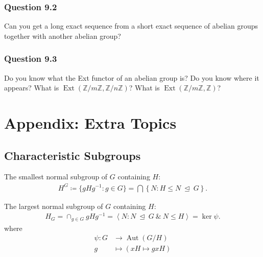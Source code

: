\hypertarget{question-9.2}{%
\subsubsection{Question 9.2}\label{question-9.2}}

Can you get a long exact sequence from a short exact sequence of abelian
groups together with another abelian group?

\hypertarget{question-9.3}{%
\subsubsection{Question 9.3}\label{question-9.3}}

Do you know what the Ext functor of an abelian group is? Do you know
where it appears? What is
\(\operatorname{Ext}({\mathbb{Z}}/m{\mathbb{Z}}, {\mathbb{Z}}/n{\mathbb{Z}})\)?
What is
\(\operatorname{Ext}({\mathbb{Z}}/m{\mathbb{Z}}, {\mathbb{Z}})\)?

\hypertarget{appendix-extra-topics}{%
\section{Appendix: Extra Topics}\label{appendix-extra-topics}}

\hypertarget{characteristic-subgroups}{%
\subsection{Characteristic Subgroups}\label{characteristic-subgroups}}

\begin{definition}

The smallest normal subgroup of \(G\) containing \(H\):
\begin{align*}
H^G \coloneqq\{gHg^{-1}: g\in G\} = \bigcap \left\{{N: H \leq N {~\trianglelefteq~}G }\right\}
.\end{align*}

\end{definition}

\begin{definition}

The largest normal subgroup of \(G\) containing \(H\):
\begin{align*}
H_G = \cap_{g\in G} gHg^{-1} = \left\langle{ N: N {~\trianglelefteq~}G ~\&~ N \leq H}\right\rangle = \ker \psi
.\end{align*}
where
\begin{align*}
\psi: G &\to {\operatorname{Aut}}(G/H) \\
g &\mapsto (xH\mapsto gxH)
\end{align*}

\end{definition}

